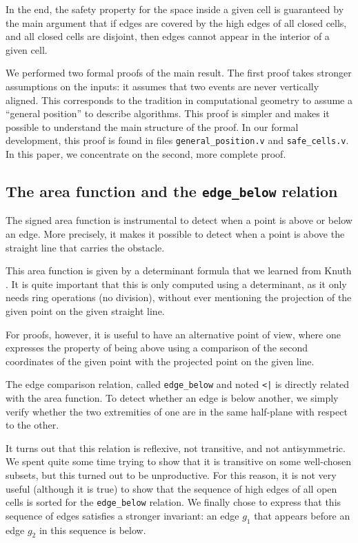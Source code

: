 \documentclass[a4paper, USenglish, cleveref, autoref, thm-restate, final]{lipics-v2021}
\begin{document}
In the end, the safety property for the space inside a given cell is
guaranteed by the main argument that if edges are covered by the high
edges of all closed cells, and all closed cells are disjoint, then
edges cannot appear in the interior of a given cell.

We performed two formal proofs of the main result.  The first proof takes
stronger assumptions on the inputs: it assumes that two events are
never vertically aligned.  This corresponds to the tradition in
computational geometry to assume a ``general position'' to describe
algorithms.  This proof is simpler
and makes it possible to understand the main structure of the proof.
In our formal development, this proof is found in files
{\tt general\_position.v} and {\tt safe\_cells.v}.
In this paper, we concentrate on the second, more complete proof.

\subsection{The area function and the {\tt edge\_below} relation}
The signed area function is instrumental to detect when a point is above or
below an edge.  More precisely, it makes it possible to detect when a
point is above the straight line that carries the obstacle.

This area function is given by a determinant formula that we learned
from Knuth \cite{KnuthAxiomsHulls}.
It is quite important that this is only computed using a
determinant, as it only needs ring operations (no division), without
ever mentioning the projection of the given point on the given
straight line.

For proofs, however, it is useful to have an alternative point of view,
where one expresses the property of being above using a comparison of
the second coordinates of the given point with the projected point on
the given line.

The edge comparison relation, called {\tt edge\_below} and
noted {\tt <|} is directly related with the area
function.  To detect whether an edge is below another, we simply
verify whether the two extremities of one are in the same half-plane
with respect to the other.

It turns out that this relation is reflexive, not transitive, and not
antisymmetric.  We spent quite some time trying to show that it is transitive
on some well-chosen subsets, but this turned out to be unproductive.  For
this reason, it is not very useful (although it is true) to show that the
sequence of high edges of all open cells is sorted for the {\tt edge\_below}
relation.  We
finally chose to express that this sequence of edges
satisfies a stronger invariant: an edge \(g_1\) that appears before an edge
\(g_2\) in this sequence is below.
\end{document}
